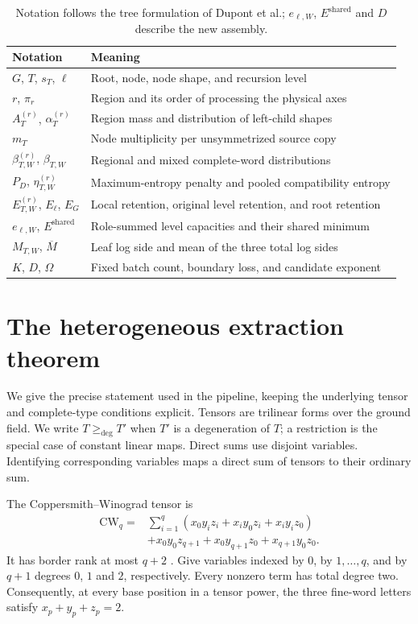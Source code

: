 \documentclass[11pt,a4paper]{article}
\newcommand{\CW}{\mathrm{CW}}
\newcommand{\dg}{\mathrel{\ge_{\mathrm{deg}}}}
\newcommand{\Eshared}{E^{\mathrm{shared}}}
\newcommand{\Mbar}{\overline M}
\begin{document}
\begin{table}[t]
\centering\small
\begin{tabularx}{\linewidth}{@{}lX@{}}
\toprule
Notation & Meaning\\
\midrule
$G$, $T$, $s_T$, $\ell$ & Root, node, node shape, and recursion level\\
$r$, $\pi_r$ & Region and its order of processing the physical axes\\
$A_T^{(r)}$, $\alpha_T^{(r)}$ & Region mass and distribution of left-child shapes\\
$m_T$ & Node multiplicity per unsymmetrized source copy\\
$\beta_{T,W}^{(r)}$, $\beta_{T,W}$ & Regional and mixed complete-word distributions\\
$P_D$, $\eta_{T,W}^{(r)}$ & Maximum-entropy penalty and pooled compatibility entropy\\
$E_{T,W}^{(r)}$, $E_\ell$, $E_G$ & Local retention, original level retention, and root retention\\
$e_{\ell,W}$, $\Eshared$ & Role-summed level capacities and their shared minimum\\
$M_{T,W}$, $\Mbar$ & Leaf log side and mean of the three total log sides\\
$K$, $D$, $\Omega$ & Fixed batch count, boundary loss, and candidate exponent\\
\bottomrule
\end{tabularx}
\caption{Notation follows the tree formulation of Dupont et al.; $e_{\ell,W}$, $\Eshared$ and $D$ describe the new assembly.}
\label{tab:notation}
\end{table}

\section{The heterogeneous extraction theorem}\label{app:theorem}

We give the precise statement used in the pipeline, keeping the underlying tensor and complete-type conditions explicit. Tensors are trilinear forms over the ground field. We write $T\dg T'$ when $T'$ is a degeneration of $T$; a restriction is the special case of constant linear maps. Direct sums use disjoint variables. Identifying corresponding variables maps a direct sum of tensors to their ordinary sum.

The Coppersmith--Winograd tensor is
\begin{equation}\label{eq:CW}
\begin{aligned}
\CW_q={}&\sum_{i=1}^q(x_0y_iz_i+x_iy_0z_i+x_iy_iz_0)\\
&+x_0y_0z_{q+1}+x_0y_{q+1}z_0+x_{q+1}y_0z_0.
\end{aligned}
\end{equation}
It has border rank at most $q+2$ \citep{cw1990}. Give variables indexed by $0$, by $1,\ldots,q$, and by $q+1$ degrees $0$, $1$ and $2$, respectively. Every nonzero term has total degree two. Consequently, at every base position in a tensor power, the three fine-word letters satisfy $x_p+y_p+z_p=2$.
\end{document}
